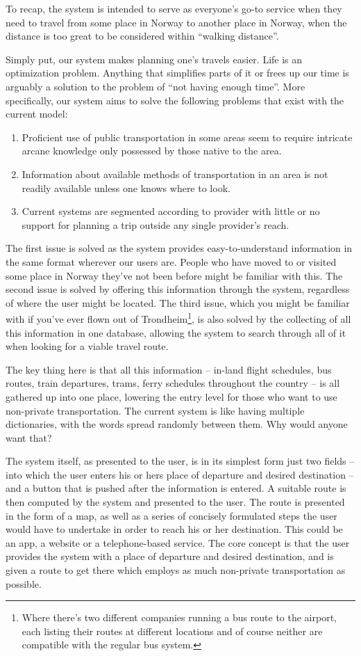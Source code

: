 To recap, the system is intended to serve as everyone's go-to service when they need to travel from some place in Norway to another place in Norway, when the distance is too great to be considered within ``walking distance''.

Simply put, our system makes planning one's travels easier.
Life is an optimization problem. Anything that simplifies parts of it or frees up our time is arguably a solution to the problem of ``not having enough time''.
More specifically, our system aims to solve the following problems that exist with the current model:
\begin{enumerate}
	\item{Proficient use of public transportation in some areas seem to require intricate arcane knowledge only possessed by those native to the area.}
	\item{Information about available methods of transportation in an area is not readily available unless one knows where to look.}
	\item{Current systems are segmented according to provider with little or no support for planning a trip outside any single provider's reach.}
\end{enumerate}
The first issue is solved as the system provides easy-to-understand information in the same format wherever our users are.
People who have moved to or visited some place in Norway they've not been before might be familiar with this.
The second issue is solved by offering this information through the system, regardless of where the user might be located.
The third issue, which you might be familiar with if you've ever flown out of Trondheim\footnote{Where there's two different companies running a bus route to the airport, each listing their routes at different locations and of course neither are compatible with the regular bus system.},
is also solved by the collecting of all this information in one database, allowing the system to search through all of it when looking for a viable travel route.

The key thing here is that all this information -- in-land flight schedules, bus routes, train departures, trams, ferry schedules throughout the country -- is all gathered up into one place, lowering the entry level for those who want to use non-private transportation.
The current system is like having multiple dictionaries, with the words spread randomly between them. Why would anyone want that?

The system itself, as presented to the user, is in its simplest form just two fields -- into which the user enters his or hers place of departure and desired destination -- and a button that is pushed after the information is entered.
A suitable route is then computed by the system and presented to the user.
The route is presented in the form of a map, as well as a series of concisely formulated steps the user would have to undertake in order to reach his or her destination.
This could be an app, a website or a telephone-based service. The core concept is that the user provides the system with a place of departure and desired destination, and is given a route to get there which employs as much non-private transportation as possible.	
